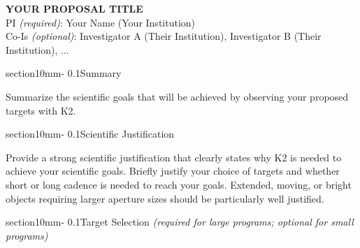 \documentclass[letterpaper,11pt]{article}
\makeatletter
\renewcommand{\section}{\@startsection%
{section}{1}{0mm}{-\baselineskip}%
{0.1\baselineskip}{\normalfont\bfseries}}%
\makeatother
\begin{document}
\pagestyle{plain}


 

\begin{center} 
\textbf{\uppercase{%
YOUR PROPOSAL TITLE \\
}}
PI \textit{(required)}: Your Name (Your Institution) \\
Co-Is \textit{(optional)}: Investigator A (Their Institution), Investigator B (Their Institution), ... \\
\end{center}





\section{Summary}

Summarize the scientific goals that will be achieved by observing your proposed targets with K2.


\section{Scientific Justification}

Provide a strong scientific justification that clearly states why K2 is needed to achieve your scientific goals. Briefly justify your choice of targets and whether short or long cadence is needed to reach your goals. Extended, moving, or bright objects requiring larger aperture sizes should be particularly well justified.

\section{Target Selection \textit{(required for large programs; optional for small programs)}}
\end{document}
